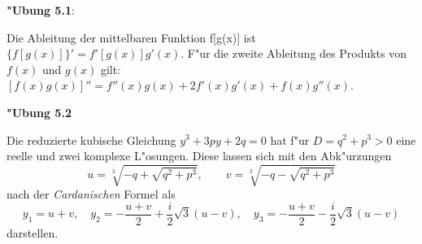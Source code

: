 \documentclass{article}
\begin{document}
\textbf{"Ubung 5.1}:

Die Ableitung der mittelbaren Funktion f[g(x)] ist
$\{f[g(x)]\}' = f'[g(x)]g'(x)$. F"ur die zweite Ableitung des
Produkts von $f(x)$ und $g(x)$ gilt: $[f(x)g(x)]'' = f''(x)g(x) + 2f'(x)g'(x)
+ f(x)g''(x)$.

\textbf{"Ubung 5.2}

Die reduzierte kubische Gleichung $y^3 + 3py +2q = 0$ hat f"ur
$D = q^2 + p^3 > 0$ eine reelle und zwei komplexe L"osungen. Diese lassen sich
mit den Abk"urzungen
\[ u = \sqrt[3]{-q + \sqrt{q^2+p^3}},\qquad v = \sqrt[3]{-q - \sqrt{q^2+p^3}} \]
nach der \emph{Cardanischen} Formel als
\[ y_1 = u + v,\quad y_2 = -\frac{u+v}{2} + \frac{i}{2}\sqrt{3}(u - v),\quad
   y_3 = -\frac{u+v}{2} - \frac{i}{2}\sqrt{3}(u-v) \]
darstellen.
\end{document}
